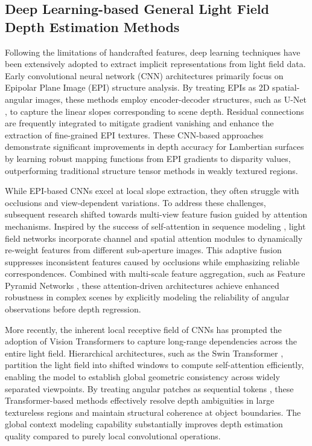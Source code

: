 \documentclass[lettersize,journal]{IEEEtran}
\begin{document}
\subsection{Deep Learning-based General Light Field Depth Estimation Methods}

Following the limitations of handcrafted features, deep learning techniques have been extensively adopted to extract implicit representations from light field data. Early convolutional neural network (CNN) architectures primarily focus on Epipolar Plane Image (EPI) structure analysis. By treating EPIs as 2D spatial-angular images, these methods employ encoder-decoder structures, such as U-Net \cite{ronneberger2015}, to capture the linear slopes corresponding to scene depth. Residual connections \cite{he2016} are frequently integrated to mitigate gradient vanishing and enhance the extraction of fine-grained EPI textures. These CNN-based approaches demonstrate significant improvements in depth accuracy for Lambertian surfaces by learning robust mapping functions from EPI gradients to disparity values, outperforming traditional structure tensor methods in weakly textured regions.

While EPI-based CNNs excel at local slope extraction, they often struggle with occlusions and view-dependent variations. To address these challenges, subsequent research shifted towards multi-view feature fusion guided by attention mechanisms. Inspired by the success of self-attention in sequence modeling \cite{vaswani2017}, light field networks incorporate channel and spatial attention modules to dynamically re-weight features from different sub-aperture images. This adaptive fusion suppresses inconsistent features caused by occlusions while emphasizing reliable correspondences. Combined with multi-scale feature aggregation, such as Feature Pyramid Networks \cite{lin2017}, these attention-driven architectures achieve enhanced robustness in complex scenes by explicitly modeling the reliability of angular observations before depth regression.

More recently, the inherent local receptive field of CNNs has prompted the adoption of Vision Transformers to capture long-range dependencies across the entire light field. Hierarchical architectures, such as the Swin Transformer \cite{liu2021}, partition the light field into shifted windows to compute self-attention efficiently, enabling the model to establish global geometric consistency across widely separated viewpoints. By treating angular patches as sequential tokens \cite{dosovitskiy2021}, these Transformer-based methods effectively resolve depth ambiguities in large textureless regions and maintain structural coherence at object boundaries. The global context modeling capability substantially improves depth estimation quality compared to purely local convolutional operations.
\end{document}
